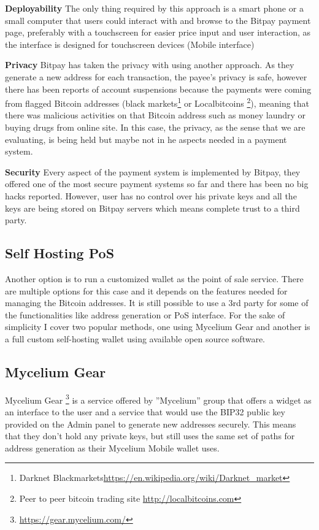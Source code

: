  \textbf{Deployability}
The only thing required by this approach is a smart phone or a small computer that users could interact with and browse to the Bitpay payment page, preferably with a touchscreen for easier price input and user interaction, as the interface is designed for touchscreen devices (Mobile interface)

 \textbf{Privacy}
Bitpay has taken the privacy with using another approach. As they generate a new address for each transaction, the payee's privacy is safe, however there has been reports of account suspensions because the payments were coming from flagged Bitcoin addresses (\eg black markets\footnote{Darknet Blackmarkets\url{https://en.wikipedia.org/wiki/Darknet_market}} or Localbitcoins \footnote{Peer to peer bitcoin trading site \url{http://localbitcoins.com}}), meaning that there was malicious activities on that Bitcoin address such as money laundry or buying drugs from online site. In this case, the privacy, as the sense that we are evaluating, is being held but maybe not in he aspects needed in a payment system.

 \textbf{Security}
Every aspect of the payment system is implemented by Bitpay, they offered one of the most secure payment systems so far and there has been no big hacks reported. However, user has no control over his private keys and all the keys are being stored on Bitpay servers which means complete trust to a third party.


\subsection{Self Hosting PoS}
Another option is to run a customized wallet as the point of sale service. There are multiple options for this case and it depends on the features needed for managing the Bitcoin addresses. It is still possible to use a 3rd party for some of the functionalities like address generation or PoS interface. For the sake of simplicity I cover two popular methods, one using Mycelium Gear and another is a full custom self-hosting wallet using available open source software.


\subsection{Mycelium Gear}
Mycelium Gear \footnote{\url{https://gear.mycelium.com/}} is a service offered by ''Mycelium'' group that offers a widget as an interface to the user and a service that would use the BIP32 public key provided on the Admin panel to generate new addresses securely. This means that they don't hold any private keys, but still uses the same set of paths for address generation as their Mycelium Mobile wallet uses.

